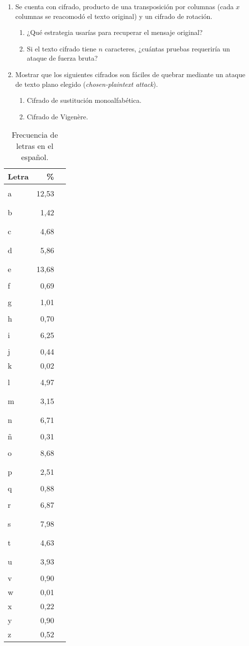 \documentclass[]{book}
\theoremstyle{definition}
\def\mybar#1{%
  #1 & {\color{black}\rule{#1ex}{8pt}}}
\begin{document}
\begin{enumerate}
\item Se cuenta con cifrado, producto de una transposición por columnas
  (cada $x$ columnas se reacomodó el texto original) y un cifrado de rotación. 
  \begin{enumerate}
    \item ¿Qué estrategia usarías para recuperar el mensaje original? 
    \item Si el texto cifrado tiene $n$ caracteres, ¿cuántas pruebas requeriría un ataque de fuerza bruta? 
  \end{enumerate}

\item Mostrar que los siguientes cifrados son fáciles de quebrar mediante un
  ataque de texto plano elegido (\textit{chosen-plaintext attack}).
  \begin{enumerate}
    \item Cifrado de sustitución monoalfabética.
    \item Cifrado de Vigenère.
  \end{enumerate}
\end{enumerate}
  \begin{table}[!h]
\centering
\caption{Frecuencia de letras en el español.%
}\label{tab:freq}
\footnotesize
\begin{tabular}{lrl}
Letra & \% & \\ \hline
a & \mybar{12,53}\\
b & \mybar{1,42}\\
c & \mybar{4,68}\\
d & \mybar{5,86}\\
e & \mybar{13,68}\\
f & \mybar{0,69}\\
g & \mybar{1,01}\\
h & \mybar{0,70}\\
i & \mybar{6,25}\\
j & \mybar{0,44}\\
k & \mybar{0,02}\\
l & \mybar{4,97}\\
m & \mybar{3,15}\\
n & \mybar{6,71}\\
ñ & \mybar{0,31}\\
o & \mybar{8,68}\\
p & \mybar{2,51}\\
q & \mybar{0,88}\\
r & \mybar{6,87}\\
s & \mybar{7,98}\\
t & \mybar{4,63}\\
u & \mybar{3,93}\\
v & \mybar{0,90}\\
w & \mybar{0,01}\\
x & \mybar{0,22}\\
y & \mybar{0,90}\\
z & \mybar{0,52}\\
\end{tabular}
\end{table}
\end{document}
